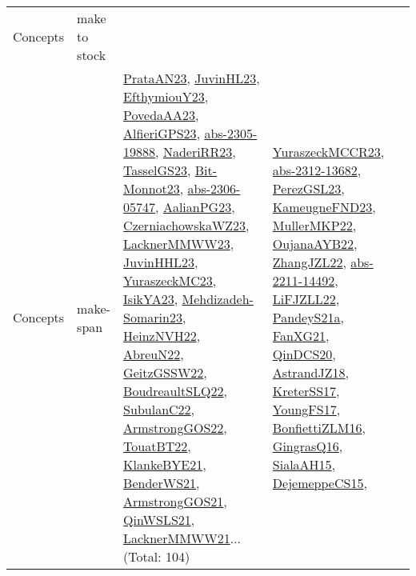 {\begin{longtable}{lp{3cm}>{\raggedright}p{6cm}>{\raggedright}p{6cm}p{8cm}}
Concepts & make to stock &  &  & \\
Concepts & make-span & \href{articles/PrataAN23.pdf}{PrataAN23}\cite{PrataAN23}, \href{papers/JuvinHL23.pdf}{JuvinHL23}\cite{JuvinHL23}, \href{papers/EfthymiouY23.pdf}{EfthymiouY23}\cite{EfthymiouY23}, \href{papers/PovedaAA23.pdf}{PovedaAA23}\cite{PovedaAA23}, \href{articles/AlfieriGPS23.pdf}{AlfieriGPS23}\cite{AlfieriGPS23}, \href{articles/abs-2305-19888.pdf}{abs-2305-19888}\cite{abs-2305-19888}, \href{articles/NaderiRR23.pdf}{NaderiRR23}\cite{NaderiRR23}, \href{papers/TasselGS23.pdf}{TasselGS23}\cite{TasselGS23}, \href{papers/Bit-Monnot23.pdf}{Bit-Monnot23}\cite{Bit-Monnot23}, \href{articles/abs-2306-05747.pdf}{abs-2306-05747}\cite{abs-2306-05747}, \href{papers/AalianPG23.pdf}{AalianPG23}\cite{AalianPG23}, \href{articles/CzerniachowskaWZ23.pdf}{CzerniachowskaWZ23}\cite{CzerniachowskaWZ23}, \href{articles/LacknerMMWW23.pdf}{LacknerMMWW23}\cite{LacknerMMWW23}, \href{papers/JuvinHHL23.pdf}{JuvinHHL23}\cite{JuvinHHL23}, \href{papers/YuraszeckMC23.pdf}{YuraszeckMC23}\cite{YuraszeckMC23}, \href{articles/IsikYA23.pdf}{IsikYA23}\cite{IsikYA23}, \href{papers/Mehdizadeh-Somarin23.pdf}{Mehdizadeh-Somarin23}\cite{Mehdizadeh-Somarin23}, \href{articles/HeinzNVH22.pdf}{HeinzNVH22}\cite{HeinzNVH22}, \href{articles/AbreuN22.pdf}{AbreuN22}\cite{AbreuN22}, \href{papers/GeitzGSSW22.pdf}{GeitzGSSW22}\cite{GeitzGSSW22}, \href{papers/BoudreaultSLQ22.pdf}{BoudreaultSLQ22}\cite{BoudreaultSLQ22}, \href{articles/SubulanC22.pdf}{SubulanC22}\cite{SubulanC22}, \href{papers/ArmstrongGOS22.pdf}{ArmstrongGOS22}\cite{ArmstrongGOS22}, \href{papers/TouatBT22.pdf}{TouatBT22}\cite{TouatBT22}, \href{papers/KlankeBYE21.pdf}{KlankeBYE21}\cite{KlankeBYE21}, \href{papers/BenderWS21.pdf}{BenderWS21}\cite{BenderWS21}, \href{papers/ArmstrongGOS21.pdf}{ArmstrongGOS21}\cite{ArmstrongGOS21}, \href{articles/QinWSLS21.pdf}{QinWSLS21}\cite{QinWSLS21}, \href{papers/LacknerMMWW21.pdf}{LacknerMMWW21}\cite{LacknerMMWW21}... (Total: 104) & \href{articles/YuraszeckMCCR23.pdf}{YuraszeckMCCR23}\cite{YuraszeckMCCR23}, \href{articles/abs-2312-13682.pdf}{abs-2312-13682}\cite{abs-2312-13682}, \href{papers/PerezGSL23.pdf}{PerezGSL23}\cite{PerezGSL23}, \href{papers/KameugneFND23.pdf}{KameugneFND23}\cite{KameugneFND23}, \href{articles/MullerMKP22.pdf}{MullerMKP22}\cite{MullerMKP22}, \href{papers/OujanaAYB22.pdf}{OujanaAYB22}\cite{OujanaAYB22}, \href{papers/ZhangJZL22.pdf}{ZhangJZL22}\cite{ZhangJZL22}, \href{articles/abs-2211-14492.pdf}{abs-2211-14492}\cite{abs-2211-14492}, \href{papers/LiFJZLL22.pdf}{LiFJZLL22}\cite{LiFJZLL22}, \href{articles/PandeyS21a.pdf}{PandeyS21a}\cite{PandeyS21a}, \href{articles/FanXG21.pdf}{FanXG21}\cite{FanXG21}, \href{articles/QinDCS20.pdf}{QinDCS20}\cite{QinDCS20}, \href{papers/AstrandJZ18.pdf}{AstrandJZ18}\cite{AstrandJZ18}, \href{articles/KreterSS17.pdf}{KreterSS17}\cite{KreterSS17}, \href{papers/YoungFS17.pdf}{YoungFS17}\cite{YoungFS17}, \href{papers/BonfiettiZLM16.pdf}{BonfiettiZLM16}\cite{BonfiettiZLM16}, \href{papers/GingrasQ16.pdf}{GingrasQ16}\cite{GingrasQ16}, \href{papers/SialaAH15.pdf}{SialaAH15}\cite{SialaAH15}, \href{papers/DejemeppeCS15.pdf}{DejemeppeCS15}\cite{DejemeppeCS15}, 
\end{longtable}}
